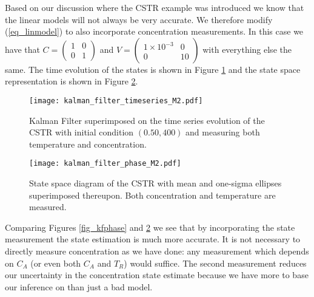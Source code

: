 Based on our discussion where the CSTR example was introduced we know that the linear models will not always be very accurate. We therefore modify (\ref{eq_linmodel}) to also incorporate concentration measurements. In this case we have that $C = \begin{pmatrix}
1 & 0\\0 &1
\end{pmatrix}$ and $V = \begin{pmatrix}
1\times 10^{-3} & 0\\0 & 10
\end{pmatrix}$ with everything else the same. The time evolution of the states is shown in Figure \ref{fig_kftime2} and the state space representation is shown in Figure \ref{fig_kfphase2}. 
\begin{figure}[H] 
\centering
\texttt{[image: kalman\_filter\_timeseries\_M2.pdf]}
\caption{Kalman Filter superimposed on the time series evolution of the CSTR with initial condition $(0.50, 400)$ and measuring both temperature and concentration.}
\label{fig_kftime2}
\end{figure}
\begin{figure}[H] 
\centering
\texttt{[image: kalman\_filter\_phase\_M2.pdf]}
\caption{State space diagram of the CSTR with mean and one-sigma ellipses superimposed thereupon. Both concentration and temperature are measured.}
\label{fig_kfphase2}
\end{figure}
Comparing Figures \ref{fig_kfphase} and \ref{fig_kfphase2} we see that by incorporating the state measurement the state estimation is much more accurate. It is not necessary to directly measure concentration as we have done: any measurement which depends on $C_A$ (or even both $C_A$ and $T_R$) would suffice. The second measurement reduces our uncertainty in the concentration state estimate because we have more to base our inference on than just a bad model.  
